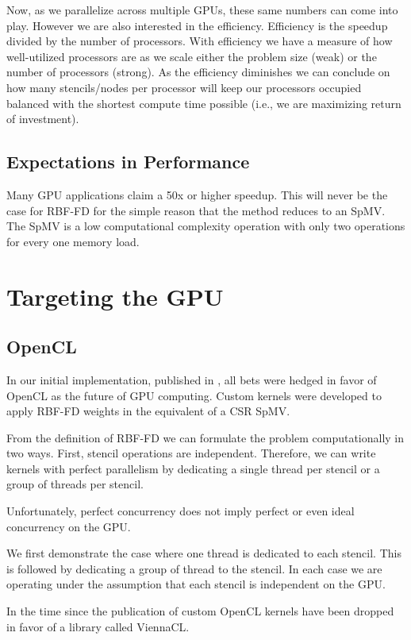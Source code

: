 \documentclass{report}
\begin{document}
Now, as we parallelize across multiple GPUs, these same numbers can come into
play. However we are also interested in the efficiency. Efficiency is the
speedup divided by the number of processors. With efficiency we have a measure
of how well-utilized processors are as we scale either the problem size (weak)
or the number of processors (strong). As the efficiency diminishes we can
conclude on how many stencils/nodes per processor will keep our processors
occupied balanced with the shortest compute time possible (i.e., we are
maximizing return of investment). 

\subsection{Expectations in Performance}
Many GPU applications claim a 50x or higher speedup. This will never be the case for RBF-FD for the simple reason that the method reduces to an SpMV. The SpMV is a low computational complexity operation with only two operations for every one memory load. 


\section{Targeting the GPU}

\subsection{OpenCL}
In our initial implementation, published in \cite{BolligFlyerErlebacher2012}, all bets were hedged in favor of OpenCL as the future of GPU computing. Custom kernels were developed to apply RBF-FD weights in the equivalent of a CSR SpMV. 


From the definition of RBF-FD we can formulate the problem computationally in two ways. First, stencil operations are independent. Therefore, we can write kernels with perfect parallelism by dedicating a single thread per stencil or a group of threads per stencil.  

Unfortunately, perfect concurrency does not imply perfect or even ideal concurrency on the GPU. 

We first demonstrate the case where one thread is dedicated to each stencil. This is followed by dedicating a group of thread to the stencil. In each case we are operating under the assumption that each stencil is independent on the GPU. 


In the time since the publication of \cite{BolligFlyerErlebacher2012} custom OpenCL kernels have been dropped in favor of a library called ViennaCL. 
\end{document}
